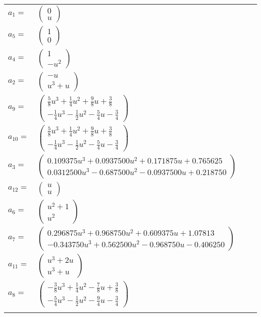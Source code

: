 \documentclass[1p]{elsarticle_modified}
\theoremstyle{definition}
\begin{document}
\begin{tabular}{m{7pt} m{180pt} m{7pt} m{180pt} }
\flushright $a_{1}=$&$\begin{pmatrix}0\\u\end{pmatrix}$ \\
\flushright $a_{5}=$&$\begin{pmatrix}1\\0\end{pmatrix}$ \\
\flushright $a_{4}=$&$\begin{pmatrix}1\\- u^2\end{pmatrix}$ \\
\flushright $a_{2}=$&$\begin{pmatrix}- u\\u^3+u\end{pmatrix}$ \\
\flushright $a_{9}=$&$\begin{pmatrix}\frac{5}{8} u^3+\frac{1}{4} u^2+\frac{9}{8} u+\frac{3}{8}\\-\frac{1}{4} u^3-\frac{1}{2} u^2-\frac{5}{4} u-\frac{3}{4}\end{pmatrix}$ \\
\flushright $a_{10}=$&$\begin{pmatrix}\frac{5}{8} u^3+\frac{1}{4} u^2+\frac{9}{8} u+\frac{3}{8}\\-\frac{1}{4} u^3-\frac{1}{2} u^2-\frac{5}{4} u-\frac{3}{4}\end{pmatrix}$ \\
\flushright $a_{3}=$&$\begin{pmatrix}0.109375 u^{3}+0.0937500 u^{2}+0.171875 u+0.765625\\0.0312500 u^{3}-0.687500 u^{2}-0.0937500 u+0.218750\end{pmatrix}$ \\
\flushright $a_{12}=$&$\begin{pmatrix}u\\u\end{pmatrix}$ \\
\flushright $a_{6}=$&$\begin{pmatrix}u^2+1\\u^2\end{pmatrix}$ \\
\flushright $a_{7}=$&$\begin{pmatrix}0.296875 u^{3}+0.968750 u^{2}+0.609375 u+1.07813\\-0.343750 u^{3}+0.562500 u^{2}-0.968750 u-0.406250\end{pmatrix}$ \\
\flushright $a_{11}=$&$\begin{pmatrix}u^3+2 u\\u^3+u\end{pmatrix}$ \\
\flushright $a_{8}=$&$\begin{pmatrix}-\frac{3}{8} u^3+\frac{1}{4} u^2-\frac{7}{8} u+\frac{3}{8}\\-\frac{5}{4} u^3-\frac{1}{2} u^2-\frac{9}{4} u-\frac{3}{4}\end{pmatrix}$\\&\end{tabular}
\end{document}
